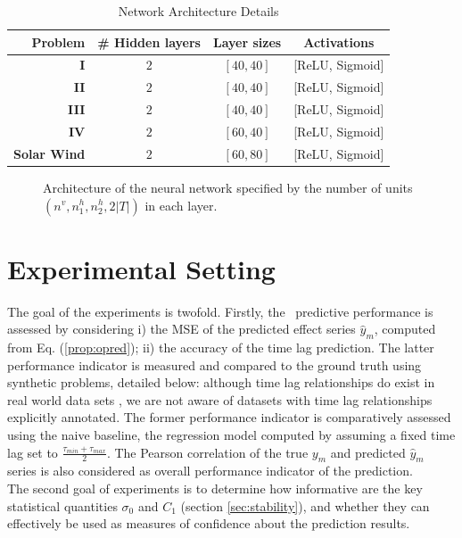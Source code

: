 \begin{table}[htbp]
  \caption{Network Architecture Details}\label{tab:arch_probs}
  \centering
  \begin{tabular}{ r c c c }
  \hline
  Problem &  \# Hidden layers & Layer sizes & Activations\\
  \hline
  \textbf{I} & $2$ & $[40, 40]$  & [ReLU, Sigmoid]\\
  \textbf{II} & $2$ & $[40, 40]$ & [ReLU, Sigmoid]\\
  \textbf{III} & $2$ & $[40, 40]$ & [ReLU, Sigmoid]\\
  \textbf{IV} & $2$ & $[60, 40]$ & [ReLU, Sigmoid]\\
  \textbf{Solar Wind} & $2$ & $[60, 80]$ & [ReLU, Sigmoid]\\
  \hline
  \end{tabular}
\end{table}


\begin{figure}[ht]
\centerline{\resizebox*{0.7\textwidth}{!}{}}
\caption{\label{fig:archi} Architecture of the neural network specified by the number of units 
$(n^v,n_1^h,n_2^h,2\vert T\vert)$ in each layer.}
\label{fig:NN}
\end{figure}

\section{Experimental Setting}\label{sec:pdtExp}

The goal of the experiments is twofold. Firstly, the \XX\ predictive performance is assessed by considering i) the MSE of the predicted effect series $\hat y_m$, computed from Eq. (\ref{prop:opred}); 
ii) the accuracy of the time lag prediction. The latter performance indicator is measured and compared to the ground truth using synthetic problems, detailed below: although time lag relationships do exist in real world data sets \citep{doi:10.1002/jgra.50429,ZHOU2006195}, we are not aware of datasets with time lag relationships explicitly annotated. The former performance indicator is comparatively assessed using the naive baseline, the regression model computed by assuming a fixed time lag set to $\frac{\tau_{min}+\tau_{max}}{2}$. The Pearson correlation of the true $y_m$ and predicted $\hat y_m$ series is also considered as overall performance indicator of the prediction.\\
The second goal of experiments is to determine how informative are the key statistical quantities $\sigma_0$ and $C_1$ (section \ref{sec:stability}), and whether they can effectively be used as measures of confidence about the prediction results. 

